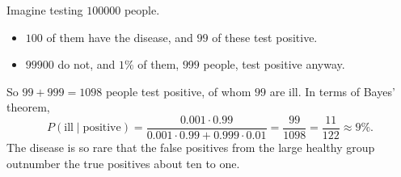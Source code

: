 Imagine testing $100000$ people.
\begin{itemize}
\item $100$ of them have the disease, and $99$ of these test positive.
\item $99900$ do not, and $1\%$ of them, $999$ people, test positive anyway.
\end{itemize}
So $99+999=1098$ people test positive, of whom $99$ are ill. In terms of Bayes' theorem,
\[P(\text{ill}\mid\text{positive})=\dfrac{0.001\cdot0.99}{0.001\cdot0.99+0.999\cdot0.01}=\dfrac{99}{1098}=\boxed{\dfrac{11}{122}}\approx9\%.\]
The disease is so rare that the false positives from the large healthy group outnumber the true positives about ten to one.
